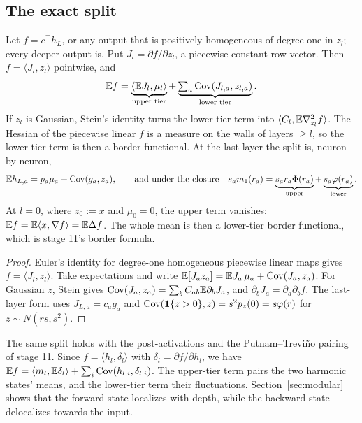 \subsection{The exact split}
\begin{proposition}\label{prop:split}
Let $f=c^{\top}h_L$, or any output that is positively homogeneous of degree one in $z_l$; every deeper output is. Put
$J_l=\partial f/\partial z_l$, a piecewise constant row vector. Then $f=\langle J_l,z_l\rangle$ pointwise, and
\[
\mathbb E f=\underbrace{\langle\mathbb E J_l,\mu_l\rangle}_{\text{upper tier}}+\underbrace{\textstyle\sum_a\operatorname{Cov}(J_{l,a},z_{l,a})}_{\text{lower tier}}.
\]
If $z_l$ is Gaussian, Stein's identity turns the lower-tier term into $\langle C_l,\mathbb E\nabla^2_{z_l}f\rangle$. The Hessian of the piecewise
linear $f$ is a measure on the walls of layers $\ge l$, so the lower-tier term is then a border functional. At the last layer the
split is, neuron by neuron,
\[
\mathbb E h_{L,a}=p_a\mu_a+\operatorname{Cov}(g_a,z_a),\qquad\text{and under the closure}\quad s_am_1(r_a)=\underbrace{s_ar_a\Phi(r_a)}_{\text{upper}}+\underbrace{s_a\varphi(r_a)}_{\text{lower}}.
\]
At $l=0$, where $z_0:=x$ and $\mu_0=0$, the upper term vanishes: $\mathbb E f=\mathbb E\langle x,\nabla f\rangle=\mathbb E\Delta f$. The whole mean is then a
lower-tier border functional, which is stage 11's border formula.
\end{proposition}
\begin{proof}
Euler's identity for degree-one homogeneous piecewise linear maps gives $f=\langle J_l,z_l\rangle$. Take expectations and write
$\mathbb E[J_az_a]=\mathbb E J_a\,\mu_a+\operatorname{Cov}(J_a,z_a)$. For Gaussian $z$, Stein gives $\operatorname{Cov}(J_a,z_a)=\sum_bC_{ab}\mathbb E\partial_bJ_a$, and
$\partial_bJ_a=\partial_a\partial_bf$. The last-layer form uses $J_{L,a}=c_ag_a$ and $\operatorname{Cov}(\mathbf 1\{z>0\},z)=s^2p_z(0)=s\varphi(r)$ for
$z\sim N(rs,s^2)$.
\end{proof}
The same split holds with the post-activations and the Putnam--Trevi\~no pairing of stage 11. Since $f=\langle h_l,\delta_l\rangle$ with
$\delta_l=\partial f/\partial h_l$, we have $\mathbb E f=\langle m_l,\mathbb E\delta_l\rangle+\sum_i\operatorname{Cov}(h_{l,i},\delta_{l,i})$. The upper-tier term pairs
the two harmonic states' means, and the lower-tier term their fluctuations. Section~\ref{sec:modular} shows that the forward state
localizes with depth, while the backward state delocalizes towards the input.
